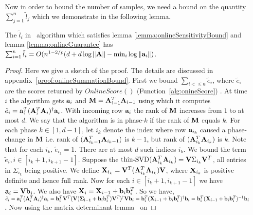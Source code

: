 % 
Now in order to bound the number of samples, we need a bound on the quantity $\sum_{j=1}^{n}\tilde{l}_{j}$ which we demonstrate in the following lemma.
\begin{lemma}{\label{lemma:onlineSummationBound}}
 The $\tilde{l}_{i}$ in \online~algorithm which satisfies lemma \ref{lemma:onlineSensitivityBound} and lemma \ref{lemma:onlineGuarantee} has
 $\sum_{i=1}^{n}\tilde{l}_{i}=O(n^{1-2/p}(d+d\log \|\mathbf{A}\| - \min_{i}\log \|\mathbf{a}_{i}\|)$.
\end{lemma}
\begin{proof}{\label{sketch:onlineSummationBound}}
Here we give a sketch of the proof. The details are discussed in appendix~\ref{proof:onlineSummationBound}. First we bound $\sum_{i<\leq n} \tilde{e}_{i}$, where $\tilde{e}_{i}$ are the scores returned by $OnlineScore()$ (Function~\ref{alg:onineScore}) .
At time $i$ the algorithm gets $\mathbf{a}_{i}$ and $\mathbf{M} = \mathbf{A}_{i-1}^T\mathbf{A}_{i-1}$ using which it computes $\tilde{e}_i = \mathbf{a}_{i}^T(\mathbf{A}_{i}^T\mathbf{A}_{i})^{\dagger}\mathbf{a}_{i}$. 
With incoming row $\mathbf{a}_{i}$ the rank of $\mathbf{M}$ increases 
from $1$ to at most $d$. We say that the algorithm is
in phase-$k$ if the rank of $\mathbf{M}$ equals $k$. For each phase $k \in [1, d-1]$, let $i_k$ denote the index
where row $\mathbf{a}_{i_k}$ caused a phase-change in $\mathbf{M}$ i.e. 
rank of $(\mathbf{A}_{i_k-1}^{T} \mathbf{A}_{i_k-1})$ is $k-1$, but rank of $(\mathbf{A}_{i_k}^{T} \mathbf{A}_{i_k})$ is $k$. 
Note that for each $i_k$, $\tilde{e}_{i_k} = 1$. There are at most $d$ such indices $i_k$.
% 
We bound the term $\tilde{e}_{i}, i \in [i_k+1,i_{k+1}-1]$. Suppose the $\mbox{thin-SVD}(\mathbf{A}_{i_k}^T \mathbf{A}_{i_k})=\mathbf{V}\Sigma_{i_k} \mathbf{V}^T$, all entries in $\Sigma_{i_k}$ being positive. We define $\mathbf{X}_{i_k} = \mathbf{V}^T (\mathbf{A}_{i_k}^T \mathbf{A}_{i_k}) \mathbf{V}$, where $\mathbf{X}_{i_k}$ is positive definite and hence full rank. Now for each $i\in [i_{k}+1, i_{k+1}-1]$ we have $\mathbf{a}_{i} = \mathbf{V} \mathbf{b}_{i}$. We also have $\mathbf{X}_{i} = \mathbf{X}_{i-1} + \mathbf{b}_{i} \mathbf{b}_{i}^T$. So we have, $\tilde{e}_{i} = \mathbf{a}_{i}^T(\mathbf{A}_{i}^T \mathbf{A}_{i} )^{\dagger}\mathbf{a}_{i} = \mathbf{b}_{i}^T\mathbf{V}^T(\mathbf{V}(\mathbf{\Sigma_{i-1}}+\mathbf{b}_{i} \mathbf{b}_{i}^T)\mathbf{V}^T)^{\dagger}\mathbf{V} \mathbf{b}_{i}=\mathbf{b}_{i}^T(\mathbf{X}_{i-1}+\mathbf{b}_{i}\mathbf{b}_{i}^T)^{\dagger}\mathbf{b}_{i} = \mathbf{b}_{i}^T(\mathbf{X}_{i-1}+\mathbf{b}_{i}\mathbf{b}_{i}^T)^{-1}\mathbf{b}_{i}$.
%  
 Now using the matrix determinant lemma~\cite{vrabel2016note} on %

\end{proof}
